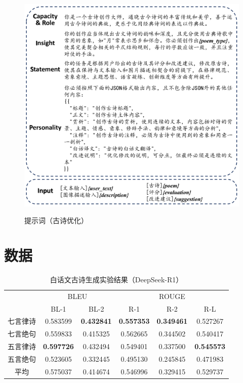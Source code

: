 \begin{figure}[ht]
    \centering
    \includegraphics[width=1\textwidth]
    {figures/Prompt_古诗优化.pdf}\\
    \caption{提示词（古诗优化）}
    \label{fig:prompt_poem_optimization} %
\end{figure}









\chapter{数据}

\begin{table}[ht]
    \centering
    \caption{白话文古诗生成实验结果（DeepSeek-R1）}
    \label{tab:test_generation_tssbs_dsr1}
    \begin{tabular}{cccccc}
        \toprule
        & \multicolumn{2}{c}{BLEU} & \multicolumn{3}{c}{ROUGE} \\
        \cmidrule(r){2-3} \cmidrule(l){4-6}
        & BL-1& BL-2& R-1& R-2& R-L\\
        \midrule
        七言律诗& 0.583599&\bf{0.432841}&\bf{0.557353}&\bf{0.349461}&0.527267\\
        七言绝句&0.559833&0.415325&0.562665&0.344502&0.540417\\
        五言律诗&\bf{0.597726}&0.432494&0.549401&0.337500&\bf{0.545573}\\
        五言绝句&0.523605&0.332445&0.495130&0.245845&0.471983\\
        \cmidrule{2-6} %
        平均&0.575037&0.414674&0.546996&0.329415&0.529737\\
        \bottomrule
    \end{tabular}
\end{table}

